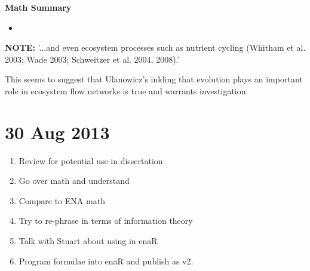 \documentclass[12pt]{article}
\begin{document}
\textbf{Math Summary}
\begin{itemize}
\item 
\end{itemize}

\textbf{NOTE:} '...and even ecosystem processes such as nutrient cycling
(Whitham et al. 2003; Wade 2003; Schweitzer et al. 2004, 2008).' 

This seems to suggest that Ulanowicz's inkling that evolution plays an
important role in ecosystem flow networks is true and warrants
investigation.



\section{30 Aug 2013}

\begin{enumerate}
\item Review for potential use in dissertation
\item Go over math and understand
\item Compare to ENA math
\item Try to re-phrase in terms of information theory
\item Talk with Stuart about using in enaR
\item Program formulae into enaR and publish as v2.\?
\end{enumerate}
\end{document}
